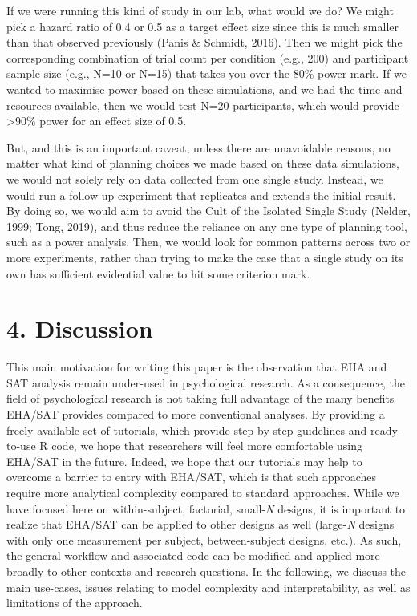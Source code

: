 \documentclass[
  man, donotrepeattitle,floatsintext]{apa6}
\begin{document}
If we were running this kind of study in our lab, what would we do?
We might pick a hazard ratio of 0.4 or 0.5 as a target effect size since this is much smaller than that observed previously (Panis \& Schmidt, 2016).
Then we might pick the corresponding combination of trial count per condition (e.g., 200) and participant sample size (e.g., N=10 or N=15) that takes you over the 80\% power mark.
If we wanted to maximise power based on these simulations, and we had the time and resources available, then we would test N=20 participants, which would provide \textgreater90\% power for an effect size of 0.5.

But, and this is an important caveat, unless there are unavoidable reasons, no matter what kind of planning choices we made based on these data simulations, we would not solely rely on data collected from one single study.
Instead, we would run a follow-up experiment that replicates and extends the initial result.
By doing so, we would aim to avoid the Cult of the Isolated Single Study (Nelder, 1999; Tong, 2019), and thus reduce the reliance on any one type of planning tool, such as a power analysis.
Then, we would look for common patterns across two or more experiments, rather than trying to make the case that a single study on its own has sufficient evidential value to hit some criterion mark.

\section{4. Discussion}\label{discussion}

This main motivation for writing this paper is the observation that EHA and SAT analysis remain under-used in psychological research. As a consequence, the field of psychological research is not taking full advantage of the many benefits EHA/SAT provides compared to more conventional analyses. By providing a freely available set of tutorials, which provide step-by-step guidelines and ready-to-use R code, we hope that researchers will feel more comfortable using EHA/SAT in the future. Indeed, we hope that our tutorials may help to overcome a barrier to entry with EHA/SAT, which is that such approaches require more analytical complexity compared to standard approaches. While we have focused here on within-subject, factorial, small-\emph{N} designs, it is important to realize that EHA/SAT can be applied to other designs as well (large-\emph{N} designs with only one measurement per subject, between-subject designs, etc.). As such, the general workflow and associated code can be modified and applied more broadly to other contexts and research questions. In the following, we discuss the main use-cases, issues relating to model complexity and interpretability, as well as limitations of the approach.
\end{document}
